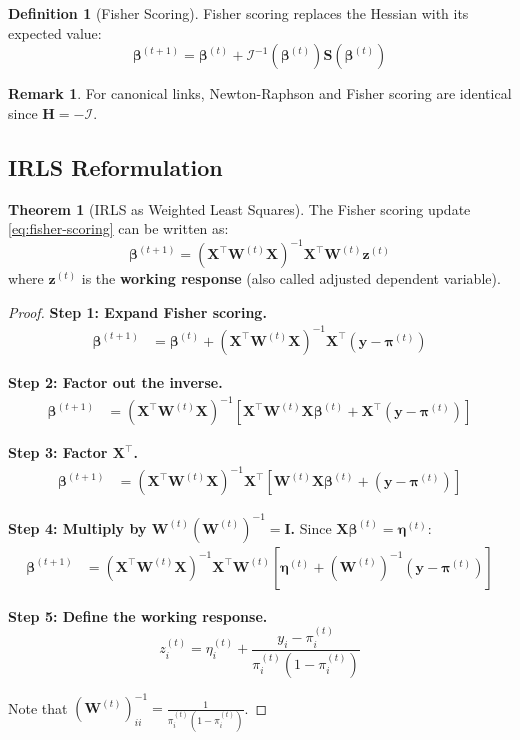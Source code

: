 \documentclass[11pt,letterpaper]{article}
\theoremstyle{definition}
\newtheorem{definition}{Definition}[section]
\newtheorem{theorem}{Theorem}[section]
\newtheorem{remark}{Remark}[section]
\newcommand{\X}{\mathbf{X}}
\newcommand{\y}{\mathbf{y}}
\newcommand{\bb}{\boldsymbol{\beta}}
\newcommand{\pp}{\boldsymbol{\pi}}
\newcommand{\ee}{\boldsymbol{\eta}}
\newcommand{\W}{\mathbf{W}}
\newcommand{\I}{\mathcal{I}}
\begin{document}
\begin{definition}[Fisher Scoring]
Fisher scoring replaces the Hessian with its expected value:
\begin{equation}
    \bb^{(t+1)} = \bb^{(t)} + \I^{-1}(\bb^{(t)}) \mathbf{S}(\bb^{(t)})
    \label{eq:fisher-scoring}
\end{equation}
\end{definition}

\begin{remark}
For canonical links, Newton-Raphson and Fisher scoring are identical since $\mathbf{H} = -\I$.
\end{remark}

\subsection{IRLS Reformulation}

\begin{theorem}[IRLS as Weighted Least Squares]
\label{thm:irls}
The Fisher scoring update \eqref{eq:fisher-scoring} can be written as:
\begin{equation}
    \bb^{(t+1)} = (\X^\top \W^{(t)} \X)^{-1} \X^\top \W^{(t)} \mathbf{z}^{(t)}
    \label{eq:irls}
\end{equation}
where $\mathbf{z}^{(t)}$ is the \textbf{working response} (also called adjusted dependent variable).
\end{theorem}

\begin{proof}
\textbf{Step 1: Expand Fisher scoring.}
\begin{align}
    \bb^{(t+1)} &= \bb^{(t)} + (\X^\top \W^{(t)} \X)^{-1} \X^\top (\y - \pp^{(t)})
\end{align}

\textbf{Step 2: Factor out the inverse.}
\begin{align}
    \bb^{(t+1)} &= (\X^\top \W^{(t)} \X)^{-1} \left[ \X^\top \W^{(t)} \X \bb^{(t)} + \X^\top (\y - \pp^{(t)}) \right]
\end{align}

\textbf{Step 3: Factor $\X^\top$.}
\begin{align}
    \bb^{(t+1)} &= (\X^\top \W^{(t)} \X)^{-1} \X^\top \left[ \W^{(t)} \X \bb^{(t)} + (\y - \pp^{(t)}) \right]
\end{align}

\textbf{Step 4: Multiply by $\W^{(t)} (\W^{(t)})^{-1} = \mathbf{I}$.}
Since $\X\bb^{(t)} = \ee^{(t)}$:
\begin{align}
    \bb^{(t+1)} &= (\X^\top \W^{(t)} \X)^{-1} \X^\top \W^{(t)} \left[ \ee^{(t)} + (\W^{(t)})^{-1}(\y - \pp^{(t)}) \right]
\end{align}

\textbf{Step 5: Define the working response.}
\begin{equation}
    z_i^{(t)} = \eta_i^{(t)} + \frac{y_i - \pi_i^{(t)}}{\pi_i^{(t)}(1 - \pi_i^{(t)})}
    \label{eq:working-response}
\end{equation}

Note that $(\W^{(t)})^{-1}_{ii} = \frac{1}{\pi_i^{(t)}(1-\pi_i^{(t)})}$.
\end{proof}
\end{document}
